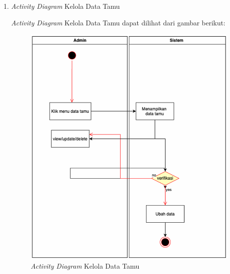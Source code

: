 \begin{enumerate}
	\item \textit{Activity Diagram} Kelola Data Tamu
        \par \textit{Activity Diagram} Kelola Data Tamu dapat dilihat dari gambar berikut:
            \begin{figure}
                \centering
                \includegraphics[width=0.95\linewidth]{uml/Activity Diagram - Kelola Tamu.png}
                \caption{\textit{Activity Diagram} Kelola Data Tamu}
            \end{figure}


\end{enumerate}
